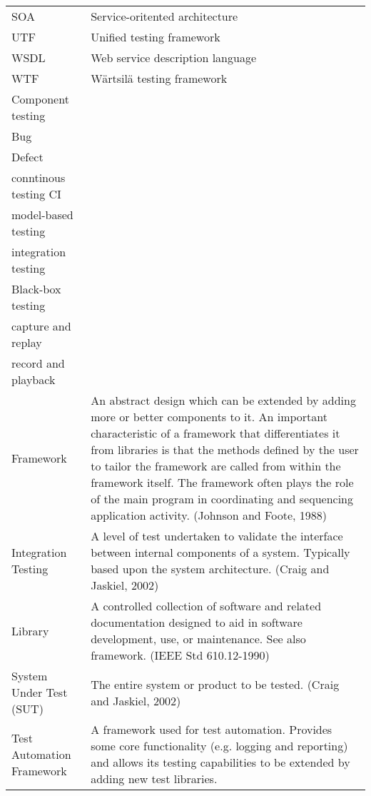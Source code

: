 \documentclass[12pt,a4paper,oneside,pdftex]{report}
\begin{document}
\noindent
\begin{longtable}{@{}p{}p{}@{}}
SOA & Service-oritented architecture \\
UTF & Unified testing framework \\
WSDL & Web service description language \\
WTF & Wärtsilä testing framework \\
Component testing & \\
Bug & \\
Defect & \\
conntinous testing CI \\
model-based testing \\
integration testing \\
Black-box testing & \\
capture and replay & \\
record and playback & \\
Framework & An abstract design which can be extended by adding more or better components to it. An important characteristic of a framework that differentiates it from libraries is that the methods defined by the user to tailor the framework are called from within the framework itself. The framework often plays the role of the main program in coordinating and sequencing application activity. (Johnson and Foote, 1988) \\
Integration Testing & A level of test undertaken to validate the interface between internal components of a system. Typically based upon the system architecture. (Craig and Jaskiel, 2002) \\
Library & A controlled collection of software and related documentation designed to aid in software development, use, or maintenance. See also framework. (IEEE Std 610.12-1990) \\
System Under Test (SUT) & The entire system or product to be tested. (Craig and Jaskiel, 2002) \\
Test Automation Framework & A framework used for test automation. Provides some core functionality (e.g. logging and reporting) and allows its testing capabilities to be extended by adding new test libraries. \\


\end{longtable}
\end{document}
